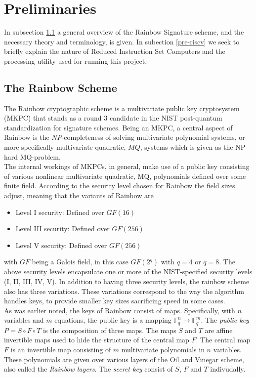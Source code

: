 \section{Preliminaries}
In subsection \ref{rainscheme} a general overview of the Rainbow Signature scheme, and the necessary theory and terminology, is given. In subection \ref{pre-riscv} we seek to briefly explain the nature of Reduced Instruction Set Computers and the processing utility used for running this project.
\subsection{The Rainbow Scheme} \label{rainscheme}
The Rainbow cryptographic scheme is a multivariate public key cryptosystem (MKPC) that stands as a round 3 candidate in the NIST post-quantum standardization for signature schemes. Being an MKPC, a central aspect of Rainbow is the $NP$-completeness of solving multivariate polynomial systems, or more specifically multivariate quadratic, $MQ$, systems which is given as the NP-hard MQ-problem. \cite{multicrypto}
\medskip\\
The internal workings of MKPCs, in general, make use of a public key consisting of various nonlinear multivariate quadratic, MQ, polynomials defined over some finite field. According to the security level chosen for Rainbow the field sizes adjust, meaning that the variants of Rainbow are 
\begin{itemize}
    \item Level I security: Defined over $GF(16)$
    \item Level III security: Defined over $GF(256)$
    \item Level V security: Defined over $GF(256)$
\end{itemize}
with $GF$ being a Galois field, in this case $GF(2^q)$ with $q = 4$ or $q=8$. The above security levels encapsulate one or more of the NIST-specified security levels (I, II, III, IV, V). In addition to having three security levels, the rainbow scheme also has three variations. These variations correspond to the way the algorithm handles keys, to provide smaller key sizes sacrificing speed in some cases. \cite{rainbownist}\medskip\\
As was earlier noted, the keys of Rainbow consist of maps. Specifically, with $n$ variables and $m$ equations, the public key is a mapping $\mathbb{F}_q^n \rightarrow \mathbb{F}_q^m$. The \textit{public key} $P = S \circ F \circ T$ is the composition of three maps. The maps $S$ and $T$ are affine invertible maps used to hide the structure of the central map $F$. The central map $F$ is an invertible map consisting of $m$ multivariate polynomials in $n$ variables. These polynomials are given over various layers of the Oil and Vinegar scheme, also called the \textit{Rainbow layers}. The \textit{secret key} consist of $S$, $F$ and $T$ indivudally. \cite{multicrypto}\medskip\\
